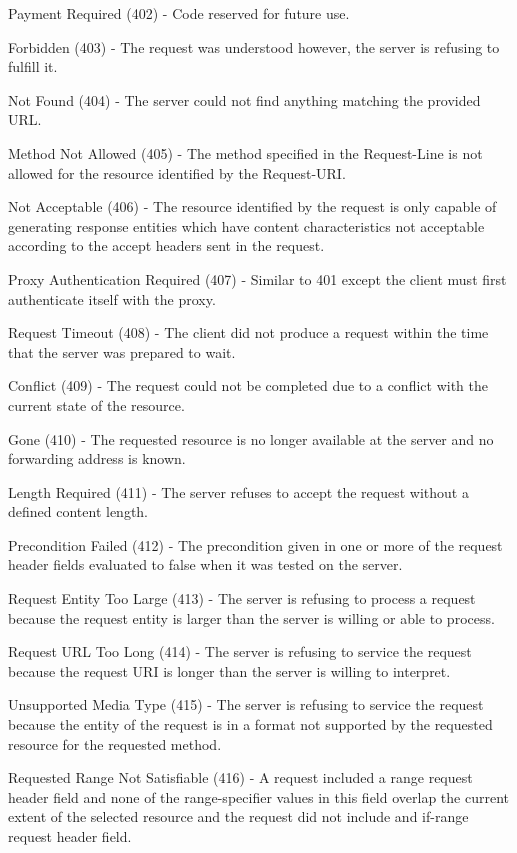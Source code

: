 \documentclass[titlepage]{article}
\begin{document}
Payment Required (402) - Code reserved for future use.

Forbidden (403) - The request was understood however, the server is refusing to fulfill it.

Not Found (404) - The server could not find anything matching the provided URL.

Method Not Allowed (405) - The method specified in the Request-Line is not allowed for the resource identified by the Request-URI.

Not Acceptable (406) - The resource identified by the request is only capable of generating response entities which have content characteristics not acceptable according to the accept headers sent in the request.

Proxy Authentication Required (407) - Similar to 401 except the client must first authenticate itself with the proxy.

Request Timeout (408) - The client did not produce a request within the time that the server was prepared to wait.

Conflict (409) - The request could not be completed due to a conflict with the current state of the resource.

Gone (410) - The requested resource is no longer available at the server and no forwarding address is known.

Length Required (411) - The server refuses to accept the request without a defined content length.

Precondition Failed (412) - The precondition given in one or more of the request header fields evaluated to false when it was tested on the server. 

Request Entity Too Large (413) - The server is refusing to process a request because the request entity is larger than the server is willing or able to process.

Request URL Too Long (414) - The server is refusing to service the request because the request URI is longer than the server is willing to interpret.

Unsupported Media Type (415) - The server is refusing to service the request because the entity of the request is in a format not supported by the requested resource for the requested method.

Requested Range Not Satisfiable (416) - A request included a range request header field and none of the range-specifier values in this field overlap the current extent of the selected resource and the request did not include and if-range request header field.
\end{document}
